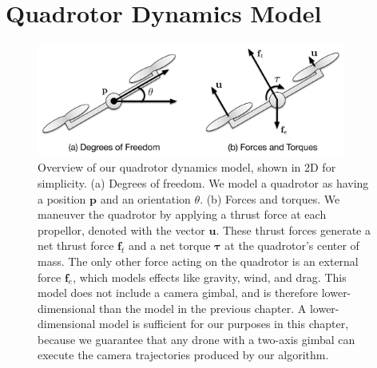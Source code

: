 

\section{Quadrotor Dynamics Model}
\label{sec:ch3:model}

\begin{figure}[t]
\centering
\includegraphics[width=4.0in]{images/2016_siggraph/10_model.pdf}
\caption{
Overview of our quadrotor dynamics model, shown in 2D for simplicity.
(a) Degrees of freedom. We model a quadrotor as having a position $\mathbf{p}$ and an orientation $\theta$.
(b) Forces and torques. We maneuver the quadrotor by applying a thrust force at each propellor, denoted with the vector $\mathbf{u}$.
These thrust forces generate a net thrust force $\mathbf{f}_t$ and a net torque $\mathbf{\tau}$ at the quadrotor's center of mass.
The only other force acting on the quadrotor is an external force $\mathbf{f}_e$, which models effects like gravity, wind, and drag.
This model does not include a camera gimbal, and is therefore lower-dimensional than the model in the previous chapter.
A lower-dimensional model is sufficient for our purposes in this chapter, because we guarantee that any drone with a two-axis gimbal can execute the camera trajectories produced by our algorithm.
}
\label{fig:ch3:model}
\end{figure}

